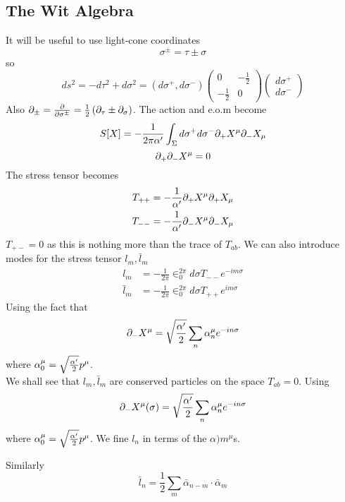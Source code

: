 \documentclass{article}
\begin{document}
\subsection{The Wit Algebra}
It will be useful to use light-cone coordinates
\[
\sigma^\pm=\tau\pm\sigma
\]
so 
\[
ds^2=-d\tau^2 + d\sigma^2 = (d\sigma^+, d\sigma^-)\begin{pmatrix} 0 & -\frac{1}{2} \\ -\frac{1}{2} & 0 \end{pmatrix} \begin{pmatrix} d\sigma^+ \\ d\sigma^- \end{pmatrix}
\]
Also $\partial_\pm=\frac{\partial}{\partial\sigma^\pm}=\frac{1}{2}\left( \partial_\tau \pm \partial_\sigma \right)$. The action and e.o.m become 
\[
S[X] = -\frac{1}{2\pi\alpha^\prime} \int_\Sigma d\sigma^+ d\sigma^- \partial_+ X^\mu \partial_- X_\mu
\]
\[
\partial_+ \partial_- X^\mu =0
\]
The stress tensor becomes 
\begin{align*}
T_{++} &= -\frac{1}{\alpha^\prime} \partial_+ X^\mu \partial_+ X_\mu \\
T_{--} &= -\frac{1}{\alpha^\prime} \partial_- X^\mu \partial_- X_\mu
\end{align*} 
$T_{+-}=0$ as this is nothing more than the trace of $T_{ab}$. We can also introduce modes for the stress tensor $l_m,\bar{l}_m$
\begin{align*}
    l_m &= -\frac{1}{2\pi} \in_0^{2\pi} d\sigma T_{--}e^{-im\sigma} \\
    \bar{l}_m &= -\frac{1}{2\pi} \in_0^{2\pi} d\sigma T_{++}e^{im\sigma}
\end{align*}
Using the fact that 
\[
\partial_- X^\mu = \sqrt{\frac{\alpha^\prime}{2}} \sum_n \alpha^\mu_n e^{-in\sigma}
\]
where $\alpha^\mu_0 = \sqrt{\frac{\alpha^\prime}{2}} p^\mu$.\\
We shall see that $l_m, \bar{l}_m$ are conserved particles on the space $T_{ab}=0$. Using 
\[
\partial_- X^\mu (\sigma) = \sqrt{\frac{\alpha^\prime}{2}} \sum_n \alpha_n^\mu e^{-in\sigma}
\]
where $\alpha_0^\mu = \sqrt{\frac{\alpha^\prime}{2}} p^\mu$. We fine $l_n$ in terms of the $\alpha)m^\mu$s.
\begin{example}
Similarly 
\[
\bar{l}_n = \frac{1}{2} \sum_m \bar{\alpha}_{n-m} \cdot \bar{\alpha}_m 
\]
\end{example}
\end{document}
